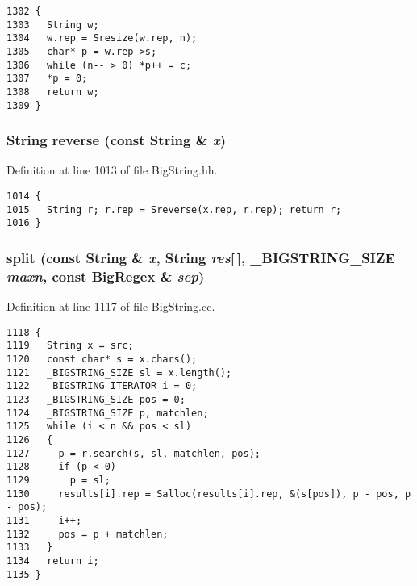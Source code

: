 \footnotesize\begin{verbatim}1302 {
1303   String w;
1304   w.rep = Sresize(w.rep, n);
1305   char* p = w.rep->s;
1306   while (n-- > 0) *p++ = c;
1307   *p = 0;
1308   return w;
1309 }
\end{verbatim}\normalsize 
{}
\subsubsection{\setlength{\rightskip}{0pt plus 5cm}String reverse (const String \& {\em x})\hspace{0.3cm}{\tt  [friend]}}\label{classString_l44}




Definition at line 1013 of file Big\-String.hh.



\footnotesize\begin{verbatim}1014 {
1015   String r; r.rep = Sreverse(x.rep, r.rep); return r;
1016 }
\end{verbatim}\normalsize 
{}
\subsubsection{ split (const String \& {\em x}, String {\em res}[$\,$], {\bf \_\-BIGSTRING\_\-SIZE} {\em maxn}, const {\bf Big\-Regex} \& {\em sep})\hspace{0.3cm}{\tt  [friend]}}\label{classString_l38}




Definition at line 1117 of file Big\-String.cc.



\footnotesize\begin{verbatim}1118 {
1119   String x = src;
1120   const char* s = x.chars();
1121   _BIGSTRING_SIZE sl = x.length();
1122   _BIGSTRING_ITERATOR i = 0;
1123   _BIGSTRING_SIZE pos = 0;
1124   _BIGSTRING_SIZE p, matchlen;
1125   while (i < n && pos < sl)
1126   {
1127     p = r.search(s, sl, matchlen, pos);
1128     if (p < 0)
1129       p = sl;
1130     results[i].rep = Salloc(results[i].rep, &(s[pos]), p - pos, p - pos);
1131     i++;
1132     pos = p + matchlen;
1133   }
1134   return i;
1135 }
\end{verbatim}\normalsize 
{}
